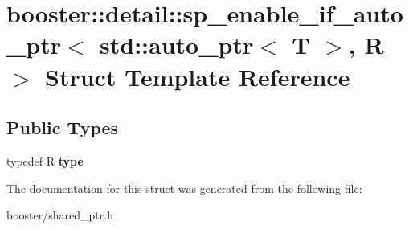 \section{booster\-:\-:detail\-:\-:sp\-\_\-enable\-\_\-if\-\_\-auto\-\_\-ptr$<$ std\-:\-:auto\-\_\-ptr$<$ T $>$, R $>$ Struct Template Reference}
\label{structbooster_1_1detail_1_1sp__enable__if__auto__ptr_3_01std_1_1auto__ptr_3_01T_01_4_00_01R_01_4}
\subsection*{Public Types}
\begin{DoxyCompactItemize}
\item 
typedef R {\bfseries type}\label{structbooster_1_1detail_1_1sp__enable__if__auto__ptr_3_01std_1_1auto__ptr_3_01T_01_4_00_01R_01_4_af21be73e74cd69e96f1c901efd574552}

\end{DoxyCompactItemize}


The documentation for this struct was generated from the following file\-:\begin{DoxyCompactItemize}
\item 
booster/shared\-\_\-ptr.\-h\end{DoxyCompactItemize}

